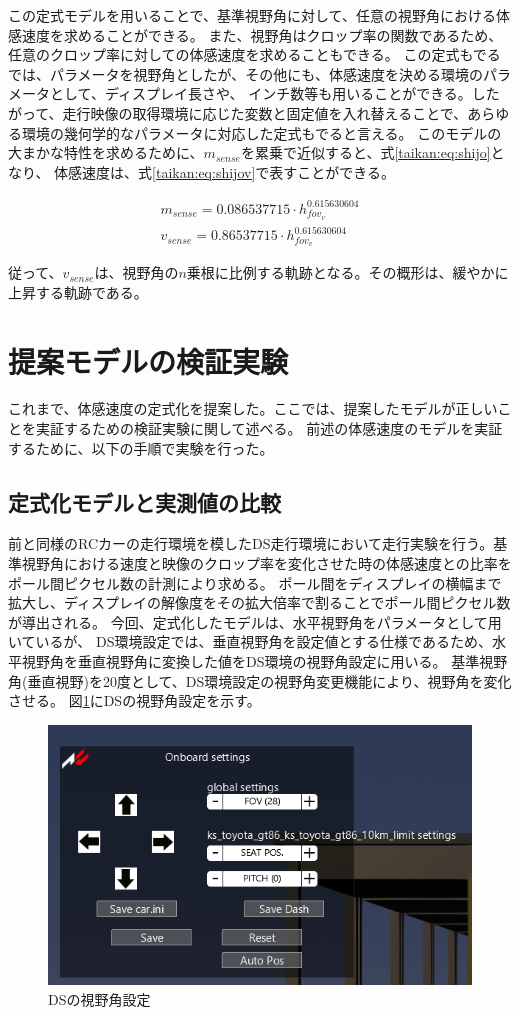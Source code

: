 この定式モデルを用いることで、基準視野角に対して、任意の視野角における体感速度を求めることができる。
また、視野角はクロップ率の関数であるため、任意のクロップ率に対しての体感速度を求めることもできる。
この定式もでるでは、パラメータを視野角としたが、その他にも、体感速度を決める環境のパラメータとして、ディスプレイ長さや、
インチ数等も用いることができる。したがって、走行映像の取得環境に応じた変数と固定値を入れ替えることで、あらゆる環境の幾何学的なパラメータに対応した定式もでると言える。
このモデルの大まかな特性を求めるために、$m_{sense}$を累乗で近似すると、式\eqref{taikan:eq:shijo}となり、
体感速度は、式\eqref{taikan:eq:shijov}で表すことができる。

\begin{align}
  m_{sense} = 0.086537715\cdot h_{fov_v}^{0.615630604} \label{taikan:eq:shijo}\\
  v_{sense} = 0.86537715\cdot h_{fov_v}^{0.615630604} \label{taikan:eq:shijov}
\end{align}

従って、$v_{sense}$は、視野角の$n$乗根に比例する軌跡となる。その概形は、緩やかに上昇する軌跡である。

\section{提案モデルの検証実験}
これまで、体感速度の定式化を提案した。ここでは、提案したモデルが正しいことを実証するための検証実験に関して述べる。
前述の体感速度のモデルを実証するために、以下の手順で実験を行った。

\subsection{定式化モデルと実測値の比較}
前と同様のRCカーの走行環境を模したDS走行環境において走行実験を行う。基準視野角における速度と映像のクロップ率を変化させた時の体感速度との比率をポール間ピクセル数の計測により求める。
ポール間をディスプレイの横幅まで拡大し、ディスプレイの解像度をその拡大倍率で割ることでポール間ピクセル数が導出される。
今回、定式化したモデルは、水平視野角をパラメータとして用いているが、
DS環境設定では、垂直視野角を設定値とする仕様であるため、水平視野角を垂直視野角に変換した値をDS環境の視野角設定に用いる。
基準視野角(垂直視野)を20度として、DS環境設定の視野角変更機能により、視野角を変化させる。
図\ref{taikan:shiyaset}にDSの視野角設定を示す。

\begin{figure}[h]
  \begin{center}
  \includegraphics[width=.65\linewidth]{img/17.png}
  \caption{DSの視野角設定}
  \label{taikan:shiyaset}
  \end{center}
\end{figure}


